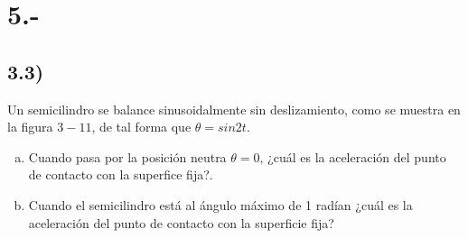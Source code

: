 \documentclass{article}
\begin{document}
\section*{5.-}
\subsection*{3.3)}
Un semicilindro se balance sinusoidalmente sin deslizamiento, como se muestra en la figura 
$3-11$, de tal forma que $\theta = sin2t$. 
\begin{enumerate}[a)]
    \item Cuando pasa por la posición neutra $\theta=0$, ¿cuál es la aceleración del punto
    de contacto con la superfice fija?. 
    \item Cuando el semicilindro está al ángulo máximo de 1 radían ¿cuál es la aceleración 
    del punto de contacto con la superficie fija?
\end{enumerate}
\end{document}
